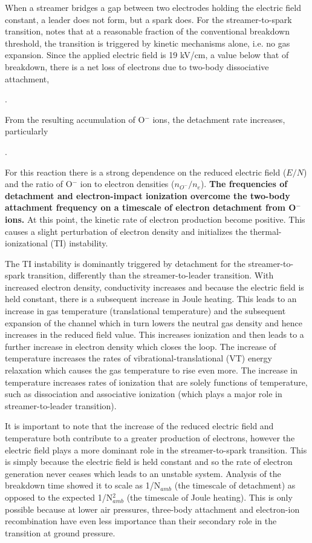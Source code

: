 \documentclass[]{article}
\begin{document}
	When a streamer bridges a gap between two electrodes holding the electric field constant, a leader does not form, but a spark does. For the streamer-to-spark transition, \citet{daSilva:2013a} notes that at a reasonable fraction of the conventional breakdown threshold, the transition is triggered by kinetic mechanisms alone, i.e. no gas expansion. Since the applied electric field is 19 kV/cm, a value below that of breakdown, there is a net loss of electrons due to two-body dissociative attachment,
	\begin{center} 
		. 
	\end{center} From the resulting accumulation of O$^-$ ions, the detachment rate increases, particularly

	\begin{center} . \end{center}
	For this reaction there is a strong dependence on the reduced electric field ($E/N$) and the ratio of O$^-$ ion to electron densities ($n_{O^-}/n_e$). \textbf{The frequencies of detachment and electron-impact ionization overcome the two-body attachment frequency on a timescale of electron detachment from O$^-$ ions.} At this point, the kinetic rate of electron production become positive. This causes a slight perturbation of electron density and initializes the thermal-ionizational (TI) instability.
	
	The TI instability is dominantly triggered by detachment for the streamer-to-spark transition, differently than the streamer-to-leader transition. With increased electron density,  conductivity increases and because the electric field is held constant, there is a subsequent increase in Joule heating. This leads to an increase in gas temperature (translational temperature) and the subsequent expansion of the channel which in turn lowers the neutral gas density and hence increases in the reduced field value. This increases ionization and then leads to a further increase in electron density which closes the loop. The increase of temperature increases the rates of vibrational-translational (VT) energy relaxation which causes the gas temperature to rise even more. The increase in temperature increases rates of ionization that are solely functions of temperature, such as dissociation and associative ionization (which plays a major role in streamer-to-leader transition). 

	It is important to note that the increase of the reduced electric field and temperature both contribute to a greater production of electrons, however the electric field plays a more dominant role in the streamer-to-spark transition. This is simply because the electric field is held constant and so the rate of electron generation never ceases which leads to an unstable system. Analysis of the breakdown time showed it to scale as 1/N$_{amb}$ (the timescale of detachment) as opposed to the expected 1/N$_{amb}^2$ (the timescale of Joule heating). This is only possible because at lower air pressures, three-body attachment and electron-ion recombination have even less importance than their secondary role in the transition at ground pressure.
	
\end{document}
